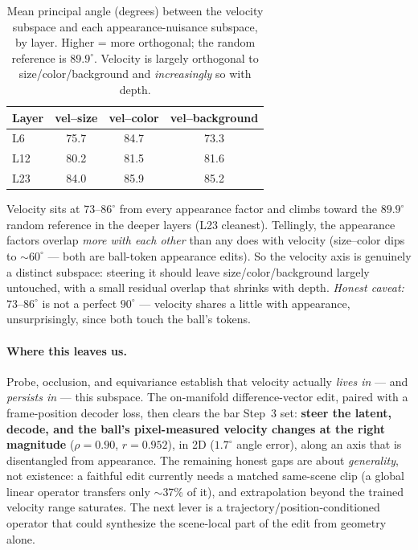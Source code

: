 \documentclass{article} %
\begin{document}
  \begin{table}[h]
  \caption{Mean principal angle (degrees) between the velocity subspace and each appearance-nuisance
  subspace, by layer. Higher = more orthogonal; the random reference is $89.9^\circ$. Velocity is
  largely orthogonal to size/color/background and \emph{increasingly} so with depth.}
  \label{tab:disentangle}
  \begin{center}
  \begin{tabular}{lccc}
  \toprule
  \textbf{Layer} & \textbf{vel--size} & \textbf{vel--color} & \textbf{vel--background} \\
  \midrule
  L6  & 75.7 & 84.7 & 73.3 \\
  L12 & 80.2 & 81.5 & 81.6 \\
  L23 & 84.0 & 85.9 & 85.2 \\
  \bottomrule
  \end{tabular}
  \end{center}
  \end{table}

  Velocity sits at $73$--$86^\circ$ from every appearance factor and climbs toward the $89.9^\circ$
  random reference in the deeper layers (L23 cleanest). Tellingly, the appearance factors overlap
  \emph{more with each other} than any does with velocity (size--color dips to $\sim60^\circ$ --- both
  are ball-token appearance edits). So the velocity axis is genuinely a distinct subspace: steering it
  should leave size/color/background largely untouched, with a small residual overlap that shrinks with
  depth. \emph{Honest caveat:} $73$--$86^\circ$ is not a perfect $90^\circ$ --- velocity shares a little
  with appearance, unsurprisingly, since both touch the ball's tokens.

  \paragraph{Where this leaves us.}
  Probe, occlusion, and equivariance establish that velocity actually \emph{lives in} --- and
  \emph{persists in} --- this subspace. The on-manifold difference-vector edit, paired with a
  frame-position decoder loss, then clears the bar Step~3 set: \textbf{steer the latent, decode, and the
  ball's pixel-measured velocity changes at the right magnitude} ($\rho=0.90$, $r=0.952$), in 2D
  ($1.7^\circ$ angle error), along an axis that is disentangled from appearance. The remaining honest
  gaps are about \emph{generality}, not existence: a faithful edit currently needs a matched same-scene
  clip (a global linear operator transfers only $\sim$37\% of it), and extrapolation beyond the trained
  velocity range saturates. The next lever is a trajectory/position-conditioned operator that could
  synthesize the scene-local part of the edit from geometry alone.
\end{document}
